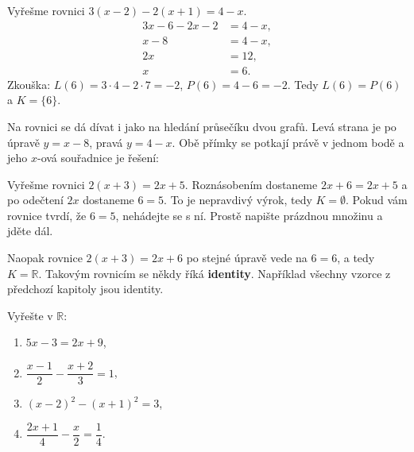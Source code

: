 \begin{example}
  Vyřešme rovnici $3(x - 2) - 2(x + 1) = 4 - x$.
  \begin{align*}
    3x - 6 - 2x - 2 &= 4 - x,\\
    x - 8 &= 4 - x,\\
    2x &= 12,\\
    x &= 6.
  \end{align*}
  Zkouška: $L(6) = 3\cdot 4 - 2\cdot 7 = -2$, $P(6) = 4 - 6 = -2$. Tedy $L(6) = P(6)$ a $K = \{6\}$.

  Na rovnici se dá dívat i jako na hledání průsečíku dvou grafů. Levá strana je po úpravě $y = x - 8$, pravá $y = 4 - x$. Obě přímky se potkají právě v jednom bodě a jeho $x$-ová souřadnice je řešení:
  \begin{center}
  \end{center}
\end{example}

\begin{example}
  Vyřešme rovnici $2(x + 3) = 2x + 5$. Roznásobením dostaneme $2x + 6 = 2x + 5$ a po odečtení $2x$ dostaneme $6 = 5$. To je nepravdivý výrok, tedy $K = \emptyset$. Pokud vám rovnice tvrdí, že $6 = 5$, nehádejte se s ní. Prostě napište prázdnou množinu a jděte dál.

  Naopak rovnice $2(x + 3) = 2x + 6$ po stejné úpravě vede na $6 = 6$, a tedy $K = \mathbb{R}$. Takovým rovnicím se někdy říká \textbf{identity}. Například všechny vzorce z předchozí kapitoly jsou identity.
\end{example}

\begin{problem}
  Vyřešte v $\mathbb{R}$:
  \begin{enumerate}[label=(\alph*)]
    \item $5x - 3 = 2x + 9$,
    \item $\dfrac{x - 1}{2} - \dfrac{x + 2}{3} = 1$,
    \item $(x - 2)^2 - (x + 1)^2 = 3$,
    \item $\dfrac{2x + 1}{4} - \dfrac{x}{2} = \dfrac{1}{4}$.
  \end{enumerate}
\end{problem}

